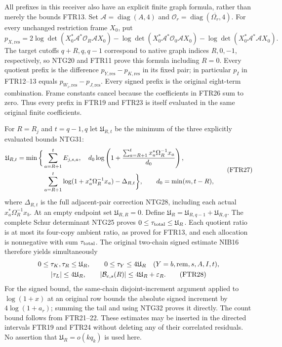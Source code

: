 \documentclass[11pt,a4paper]{article}
\begin{document}
All prefixes in this receiver also have an explicit finite graph
formula, rather than merely the bounds FTR13. Set
$\mathcal A=\operatorname{diag}(A,4)$ and
$\mathcal O_r=\operatorname{diag}(\overline{\Omega_r},4)$.
For every unchanged restriction frame $X_0$, put
\[
 p_{X,\mathrm{res}}=2\log\det(X_0^*\mathcal A^*\mathcal O_R\mathcal A X_0)
       -\log\det(X_0^*\mathcal A^*\mathcal O_0\mathcal A X_0)
       -\log\det(X_0^*\mathcal A^*\mathcal A X_0).        \tag{FTR26}
\]
The target cutoffs $q+R,q,q-1$ correspond to native graph
indices $R,0,-1$, respectively, so NTG20 and FTR11 prove this
formula including $R=0$. Every quotient prefix is the difference
$p_{Y,\mathrm{res}}-p_{K,\mathrm{res}}$ in its fixed pair;
in particular $p_I$ in FTR12--13 equals
$p_{W_i,\mathrm{res}}-p_{J,\mathrm{res}}$.
Every signed prefix is the original
eight-term combination. Frame constants cancel because the
coefficients in FTR26 sum to zero. Thus every prefix in FTR19
and FTR23 is itself evaluated in the same original finite coefficients.

For $R=R_j$ and $t=q-1,q$ let $\mathfrak U_{R,t}$ be the
minimum of the three explicitly evaluated bounds NTG31:
\[
\begin{split}
 \mathfrak U_{R,t}=\min\bigg\{&\sum_{a=R+1}^{t}E_{j,s,a},\quad
 d_0\log\left(1+{\sum_{a=R+1}^{t}x_a^*\Omega_R^{-1}x_a\over d_0}\right),\\
 &\sum_{a=R+1}^{t}\log(1+x_a^*\Omega_R^{-1}x_a)
       -\Delta_{R,t}\bigg\},\qquad d_0=\min(m,t-R),
%
\end{split}\tag{FTR27}
\]
where $\Delta_{R,t}$ is the full adjacent-pair correction NTG28,
including each actual $x_a^*\Omega_R^{-1}x_b$. At an empty endpoint
set $\mathfrak U_{R,R}=0$. Define
$\mathfrak U_R=\mathfrak U_{R,q-1}+\mathfrak U_{R,q}$.
The complete Schur determinant NTG25 proves
$0\le\tau_{\rm total}\le\mathfrak U_R$.
Each quotient ratio is at most its four-copy ambient ratio,
as proved for FTR13, and each allocation is nonnegative with
sum $\tau_{\rm total}$. The original two-chain signed estimate
NIB16 therefore yields simultaneously
\[
\begin{gathered}
 0\le\tau_K,\tau_R\le\mathfrak U_R,\qquad
 0\le\tau_Y\le4\mathfrak U_R\quad
                 (Y=b,{\rm rem},s,A,I,t),\\
 |\tau_L|\le4\mathfrak U_R,\qquad
 |\mathcal B_{e,s}(R)|\le4\mathfrak U_R+\varepsilon_R .  \tag{FTR28}
\end{gathered}
\]
For the signed bound, the same-chain disjoint-increment argument
applied to $\log(1+x)$ at an original row bounds the absolute
signed increment by $4\log(1+a_r)$; summing the tail and using
NTG32 proves it directly. The count bound follows from FTR21--22.
These estimates may be inserted in the directed intervals FTR19
and FTR24 without deleting any of their correlated residuals.
No assertion that $\mathfrak U_R=o(kq_k)$ is used here.
\end{document}
